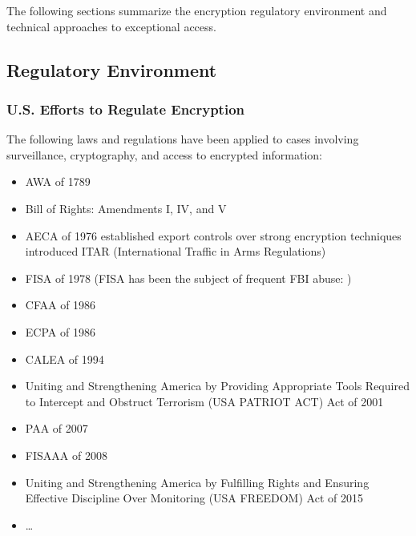 
The following sections summarize the encryption regulatory environment and technical approaches to exceptional access.

\subsection{Regulatory Environment}
\label{sec-reg-environment}

\subsubsection*{U.S. Efforts to Regulate Encryption}

The following laws and regulations have been applied to cases involving surveillance, cryptography, and access to
encrypted information:

\begin{itemize}
    \item \acf{AWA} of 1789 \cite{congress_1789}
    \item Bill of Rights: Amendments I, IV, and V \cite{madison_1791}
    \item \acf{AECA} of 1976 established export controls over strong encryption techniques
        introduced ITAR (International Traffic in Arms Regulations) \cite{morgan_hr13680_1976} \cite{kehl_right_2015}
    \item \acf{FISA} of 1978 \cite{rodino_1978}
        (FISA has been the subject of frequent FBI abuse: \cite{shamsi_2011} \cite{tucker_2020})
    \item \acf{CFAA} of 1986 \cite{hughes_hr4718_1986} \cite{wolff_computer_2016}
    \item \acf{ECPA} of 1986 \cite{kastenmeier_hr4952_1986}
    \item \acf{CALEA} of 1994 \cite{edwards_hr4922_1994}
    \item Uniting and Strengthening America by Providing Appropriate Tools Required to Intercept and Obstruct Terrorism
        (USA PATRIOT ACT) Act of 2001 \cite{sensenbrenner_2001}
    \item \acf{PAA} of 2007 \cite{mcconnell_s1927_2007}
    \item \acf{FISAAA} of 2008 \cite{reyes_hr6304_2008}
    \item Uniting and Strengthening America by Fulfilling Rights and Ensuring Effective Discipline Over Monitoring
        (USA FREEDOM) Act of 2015 \cite{sensenbrenner_2015}
    \item \dots
\end{itemize}

